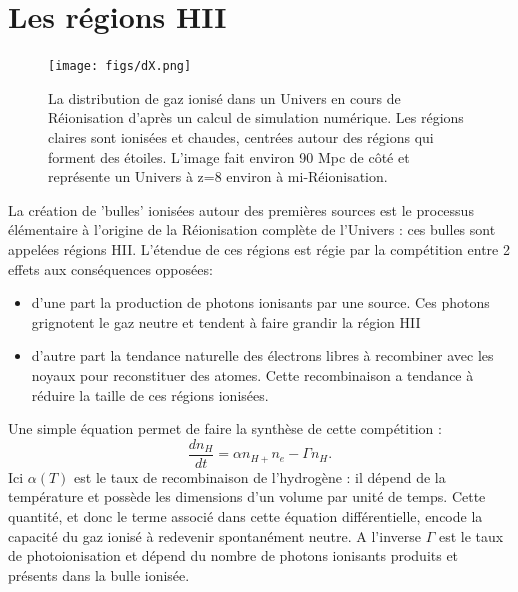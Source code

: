 \section{Les régions HII}

\begin{figure}[htbp]
	\centering
		\texttt{[image: figs/dX.png]}
		\caption[Le réseau de bulles ionisées de la Réionisation]{La distribution de gaz ionisé dans un Univers en cours de Réionisation d'après un calcul de simulation numérique. Les régions claires sont ionisées et chaudes, centrées autour des régions qui forment des étoiles. L'image fait environ 90 Mpc de côté et représente un Univers à z=8 environ à mi-Réionisation.}
	\label{f:dX}
\end{figure} 

La création de 'bulles' ionisées autour des premières sources est le processus élémentaire à l'origine de la Réionisation complète de l'Univers : ces bulles sont appelées régions HII. L'étendue de ces régions est régie par la compétition entre 2 effets aux conséquences opposées:
\begin{itemize}
\item d'une part la production de photons ionisants par une source. Ces photons  grignotent le gaz neutre et tendent à faire grandir la région HII
\item d'autre part la tendance naturelle des électrons libres à recombiner avec les noyaux pour reconstituer des atomes. Cette recombinaison a tendance à réduire la taille de ces régions ionisées.
\end{itemize}
Une simple équation permet de faire la synthèse de cette compétition :
\begin{equation}
\frac{d n_H}{dt}=\alpha n_{H+}n_e -\Gamma n_H.
\end{equation}
Ici $\alpha(T)$ est le taux de recombinaison de l'hydrogène : il dépend de la température et possède les dimensions d'un volume par unité de temps. Cette quantité, et donc le terme associé dans cette équation différentielle, encode la capacité du gaz ionisé à redevenir spontanément neutre.  A l'inverse $\Gamma$ est le taux de photoionisation et dépend du nombre de photons ionisants produits et présents dans la bulle ionisée.

